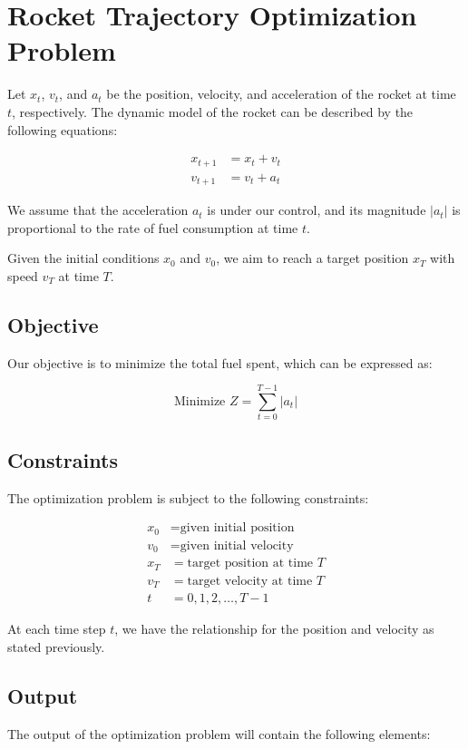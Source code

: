 \documentclass{article}
\begin{document}
\section*{Rocket Trajectory Optimization Problem}

Let \( x_t \), \( v_t \), and \( a_t \) be the position, velocity, and acceleration of the rocket at time \( t \), respectively. The dynamic model of the rocket can be described by the following equations:

\begin{align}
    x_{t+1} &= x_t + v_t \\
    v_{t+1} &= v_t + a_t
\end{align}

We assume that the acceleration \( a_t \) is under our control, and its magnitude \( |a_t| \) is proportional to the rate of fuel consumption at time \( t \).

Given the initial conditions \( x_0 \) and \( v_0 \), we aim to reach a target position \( x_T \) with speed \( v_T \) at time \( T \).

\subsection*{Objective}
Our objective is to minimize the total fuel spent, which can be expressed as:

\[
\text{Minimize } Z = \sum_{t=0}^{T-1} |a_t|
\]

\subsection*{Constraints}
The optimization problem is subject to the following constraints:

\begin{align}
    x_0 &= \text{given initial position} \\
    v_0 &= \text{given initial velocity} \\
    x_T &= \text{target position at time } T \\
    v_T &= \text{target velocity at time } T \\
    t & = 0, 1, 2, \ldots, T-1
\end{align}

At each time step \( t \), we have the relationship for the position and velocity as stated previously.

\subsection*{Output}
The output of the optimization problem will contain the following elements:
\end{document}
